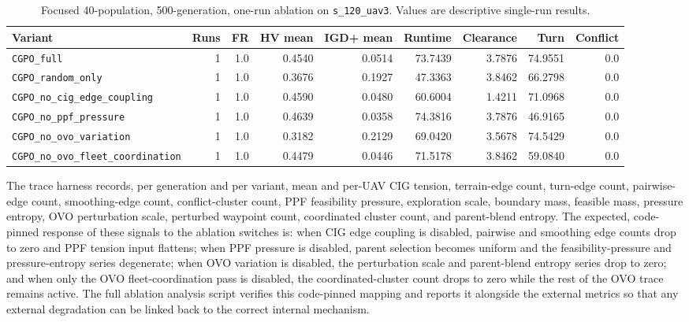 \documentclass[a4paper,fleqn]{cas-dc}
\begin{document}
\begin{table}[t]
\centering
\scriptsize
\caption{Focused 40-population, 500-generation, one-run ablation on \texttt{s\_120\_uav3}. Values are descriptive single-run results.}
\label{tab:focused-ablation}
\begin{tabular}{lrrrrrrrr}
\toprule
Variant & Runs & FR & HV mean & IGD+ mean & Runtime & Clearance & Turn & Conflict \\
\midrule
\texttt{CGPO\_full} & 1 & 1.0 & 0.4540 & 0.0514 & 73.7439 & 3.7876 & 74.9551 & 0.0 \\
\texttt{CGPO\_random\_only} & 1 & 1.0 & 0.3676 & 0.1927 & 47.3363 & 3.8462 & 66.2798 & 0.0 \\
\texttt{CGPO\_no\_cig\_edge\_coupling} & 1 & 1.0 & 0.4590 & 0.0480 & 60.6004 & 1.4211 & 71.0968 & 0.0 \\
\texttt{CGPO\_no\_ppf\_pressure} & 1 & 1.0 & 0.4639 & 0.0358 & 74.3816 & 3.7876 & 46.9165 & 0.0 \\
\texttt{CGPO\_no\_ovo\_variation} & 1 & 1.0 & 0.3182 & 0.2129 & 69.0420 & 3.5678 & 74.5429 & 0.0 \\
\texttt{CGPO\_no\_ovo\_fleet\_coordination} & 1 & 1.0 & 0.4479 & 0.0446 & 71.5178 & 3.8462 & 59.0840 & 0.0 \\
\bottomrule
\end{tabular}
\end{table}

\label{sec:ablation}

The trace harness records, per generation and per variant, mean and per-UAV CIG tension, terrain-edge count, turn-edge count, pairwise-edge count, smoothing-edge count, conflict-cluster count, PPF feasibility pressure, exploration scale, boundary mass, feasible mass, pressure entropy, OVO perturbation scale, perturbed waypoint count, coordinated cluster count, and parent-blend entropy. The expected, code-pinned response of these signals to the ablation switches is: when CIG edge coupling is disabled, pairwise and smoothing edge counts drop to zero and PPF tension input flattens; when PPF pressure is disabled, parent selection becomes uniform and the feasibility-pressure and pressure-entropy series degenerate; when OVO variation is disabled, the perturbation scale and parent-blend entropy series drop to zero; and when only the OVO fleet-coordination pass is disabled, the coordinated-cluster count drops to zero while the rest of the OVO trace remains active. The full ablation analysis script verifies this code-pinned mapping and reports it alongside the external metrics so that any external degradation can be linked back to the correct internal mechanism.
\end{document}
